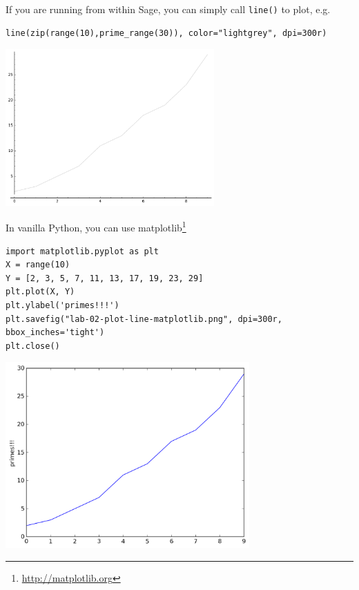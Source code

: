 \documentclass[10pt,a4paper,nobib]{tufte-handout}
\begin{document}
If you are running from within Sage, you can simply call \texttt{line()} to plot, e.g. 

\lstset{language=sage,label= ,caption= ,captionpos=b,numbers=none}
\begin{lstlisting}
line(zip(range(10),prime_range(30)), color="lightgrey", dpi=300r)
\end{lstlisting}

\begin{center}
\includegraphics[width=0.6\textwidth]{lab-02-plot-line-sage.png}
\end{center}

In vanilla Python, you can use matplotlib\footnote{\url{http://matplotlib.org}}

\lstset{language=sage,label= ,caption= ,captionpos=b,numbers=none}
\begin{lstlisting}
import matplotlib.pyplot as plt
X = range(10)
Y = [2, 3, 5, 7, 11, 13, 17, 19, 23, 29]
plt.plot(X, Y)
plt.ylabel('primes!!!')
plt.savefig("lab-02-plot-line-matplotlib.png", dpi=300r, bbox_inches='tight')
plt.close()
\end{lstlisting}

\begin{center}
\includegraphics[width=0.7\textwidth]{./lab-02-plot-line-matplotlib.png}
\end{center} 
\end{document}

